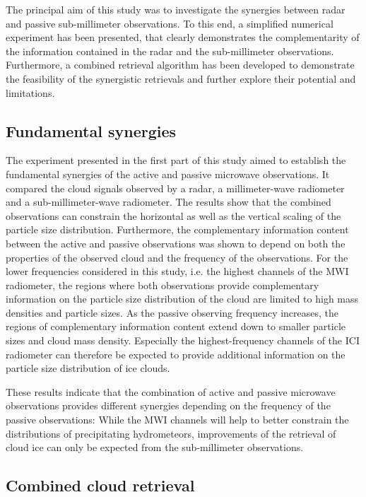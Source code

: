 \documentclass[journal abbreviation, manuscript]{copernicus}
\begin{document}
The principal aim of this study was to investigate the synergies between radar
and passive sub-millimeter observations. To this end, a simplified numerical
experiment has been presented, that clearly demonstrates the complementarity of
the information contained in the radar and the sub-millimeter observations.
Furthermore, a combined retrieval algorithm has been developed to demonstrate
the feasibility of the synergistic retrievals and further explore their
potential and limitations.

\subsection{Fundamental synergies}

The experiment presented in the first part of this study aimed to establish the
fundamental synergies of the active and passive microwave observations. It
compared the cloud signals observed by a radar, a millimeter-wave radiometer and
a sub-millimeter-wave radiometer. The results show that the combined
observations can constrain the horizontal as well as the vertical scaling of the
particle size distribution. Furthermore, the complementary information content
between the active and passive observations was shown to depend on both the
properties of the observed cloud and the frequency of the observations. For the
lower frequencies considered in this study, i.e. the highest channels of the MWI
radiometer, the regions where both observations provide complementary
information on the particle size distribution of the cloud are limited to high
mass densities and particle sizes. As the passive observing frequency increases,
the regions of complementary information content extend down to smaller particle
sizes and cloud mass density. Especially the highest-frequency channels of the
ICI radiometer can therefore be expected to provide additional information on
the particle size distribution of ice clouds.

These results indicate that the combination of active and passive microwave
observations provides different synergies depending on the frequency of the
passive observations: While the MWI channels will help to better constrain the
distributions of precipitating hydrometeors, improvements of the retrieval of
cloud ice can only be expected from the sub-millimeter observations.

\subsection{Combined cloud retrieval}
\end{document}

